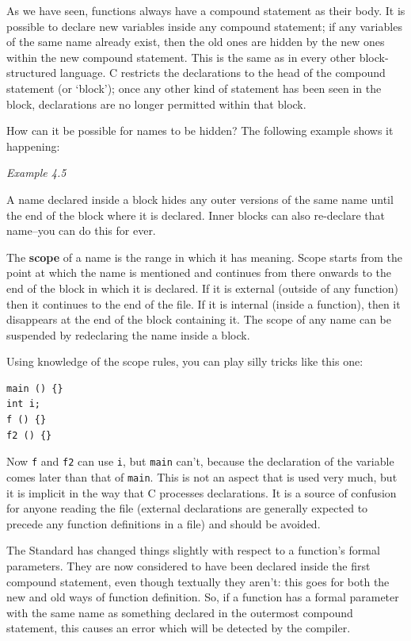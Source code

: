   As we have seen, functions always have a compound statement as their
    body. It is possible to declare new variables inside any compound
    statement; if any variables of the same name already exist, then the old
    ones are hidden by the new ones within the new compound statement. This
    is the same as in every other block-structured language. C restricts the
    declarations to the head of the compound statement (or `block');
    once any other kind of statement has been seen in the block,
    declarations are no longer permitted within that block.


   How can it be possible for names to be hidden? The following example
    shows it happening:

\begin{center}\textit{Example 4.5}\end{center}

   A name declared inside a block hides any outer versions of the same
    name until the end of the block where it is declared. Inner blocks can
    also re-declare that name--you can do this for ever.


   The \textbf{scope} of a name is the range in which it has meaning.
    Scope starts from the point at which the name is mentioned and continues
    from there onwards to the end of the block in which it is declared. If
    it is external (outside of any function) then it continues to the end of
    the file. If it is internal (inside a function), then it disappears at
    the end of the block containing it. The scope of any name can be
    suspended by redeclaring the name inside a block.


   Using knowledge of the scope rules, you can play silly tricks like
    this one:

\begin{Verbatim}
main () {}
int i;
f () {}
f2 () {}
\end{Verbatim}

   Now \texttt{f} and \texttt{f2} can use \texttt{i}, but
    \texttt{main} can't, because the declaration of the variable comes
    later than that of \texttt{main}. This is not an aspect that is used
    very much, but it is implicit in the way that C processes declarations.
    It is a source of confusion for anyone reading the file (external
    declarations are generally expected to precede any function definitions
    in a file) and should be avoided.


   The Standard has changed things slightly with respect to a function's
    formal parameters. They are now considered to have been declared inside
    the first compound statement, even though textually they aren't: this
    goes for both the new and old ways of function definition. So, if a
    function has a formal parameter with the same name as something declared
    in the outermost compound statement, this causes an error which will be
    detected by the compiler.


